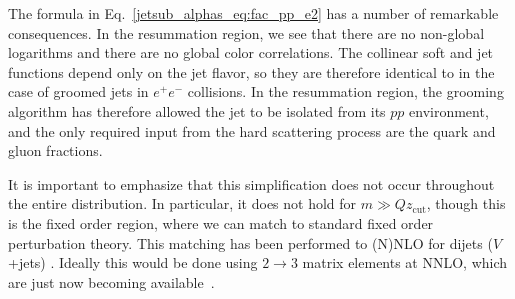 \documentclass[11pt]{cernrep}
\begin{document}
The formula in Eq.~\ref{jetsub_alphas_eq:fac_pp_e2} has a number of remarkable consequences.
%
In the resummation region, we see that there are no non-global logarithms and there are no global color correlations.
%
The collinear soft and jet functions depend only on the jet flavor, so they are therefore identical to in the case of groomed jets in $e^+e^-$ collisions.
%
In the resummation region, the grooming algorithm has therefore allowed the jet to be isolated from its $pp$ environment, and the only required input from the hard scattering process are the quark and gluon fractions. 

It is important to emphasize that this simplification does not occur throughout the entire distribution.
%
In particular, it does not hold for $m \gg Qz_{\mathrm{cut}} $, though this is the fixed order region, where we can match to standard fixed order perturbation theory.
%
This matching has been performed to (N)NLO for dijets ($V$+jets) \cite{Frye:2016aiz,Marzani:2017kqd,Marzani:2017mva}.
%
Ideally this would be done using $2\to 3$ matrix elements at NNLO, which are just now becoming available~\cite{Gehrmann:2015bfy,Dunbar:2016aux,Badger:2013yda,Badger:2017jhb,Abreu:2017hqn}.



%

%
%
\end{document}
